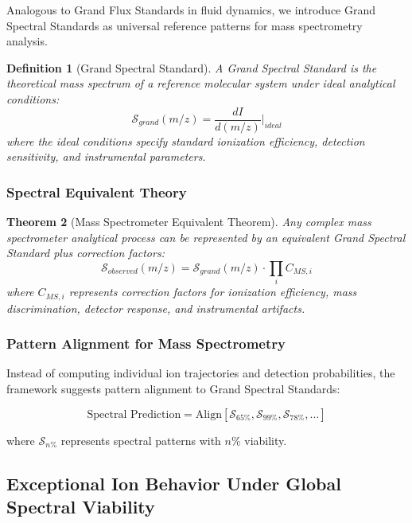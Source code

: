 \documentclass[11pt,a4paper]{article}
\newtheorem{theorem}{Theorem}[section]
\newtheorem{definition}[theorem]{Definition}
\theoremstyle{remark}
\begin{document}
Analogous to Grand Flux Standards in fluid dynamics, we introduce Grand Spectral Standards as universal reference patterns for mass spectrometry analysis.

\begin{definition}[Grand Spectral Standard]
A Grand Spectral Standard is the theoretical mass spectrum of a reference molecular system under ideal analytical conditions:
\begin{equation}
\mathcal{S}_{grand}(m/z) = \frac{dI}{d(m/z)}\bigg|_{ideal}
\end{equation}
where the ideal conditions specify standard ionization efficiency, detection sensitivity, and instrumental parameters.
\end{definition}

\subsubsection{Spectral Equivalent Theory}

\begin{theorem}[Mass Spectrometer Equivalent Theorem]
Any complex mass spectrometer analytical process can be represented by an equivalent Grand Spectral Standard plus correction factors:
\begin{equation}
\mathcal{S}_{observed}(m/z) = \mathcal{S}_{grand}(m/z) \cdot \prod_{i} C_{MS,i}
\end{equation}
where $C_{MS,i}$ represents correction factors for ionization efficiency, mass discrimination, detector response, and instrumental artifacts.
\end{theorem}

\subsubsection{Pattern Alignment for Mass Spectrometry}

Instead of computing individual ion trajectories and detection probabilities, the framework suggests pattern alignment to Grand Spectral Standards:

\begin{equation}
\text{Spectral Prediction} = \text{Align}[\mathcal{S}_{65\%}, \mathcal{S}_{99\%}, \mathcal{S}_{78\%}, \ldots]
\end{equation}

where $\mathcal{S}_{n\%}$ represents spectral patterns with $n\%$ viability.

\subsection{Exceptional Ion Behavior Under Global Spectral Viability}
\end{document}

